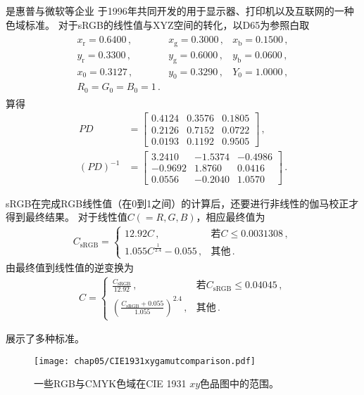 是惠普与微软等企业
于1996年共同开发的用于显示器、打印机以及互联网的一种色域标准。
对于sRGB的线性值与XYZ空间的转化，以D65为参照白取
\begin{align}
      \begin{array}{lll}
            x_\mathrm{r}=0.6400\, , & x_\mathrm{g}=0.3000\, , & x_\mathrm{b}=0.1500\, , \\
            y_\mathrm{r}=0.3300\, , & y_\mathrm{g}=0.6000\, , & y_\mathrm{b}=0.0600\, , \\
            x_0=0.3127\, ,          & y_0=0.3290\, ,          & Y_0=1.0000\, ,          \\
            R_0=G_0=B_0=1\, .       &                         &
      \end{array}
\end{align}
算得
\begin{align}
      PD        & =\left[\begin{array}{rrr}
                  0.4124 & 0.3576 & 0.1805 \\
                  0.2126 & 0.7152 & 0.0722 \\
                  0.0193 & 0.1192 & 0.9505
            \end{array}\right]\, , \\
      (PD)^{-1} & =\left[\begin{array}{rrr}
                  3.2410  & -1.5374 & -0.4986 \\
                  -0.9692 & 1.8760  & 0.0416  \\
                  0.0556  & -0.2040 & 1.0570
            \end{array}\right]\, .
\end{align}

sRGB在完成RGB线性值（在0到1之间）的计算后，还要进行非线性的伽马校正才得到最终结果。
对于线性值$C(=R,G,B)$，相应最终值为
\begin{align}
      C_{\text{sRGB}}=\left\{
      \begin{array}{ll}
            \displaystyle12.92C\, ,                       & \text{若}C\le0.0031308\, , \\
            \displaystyle1.055C^{\frac{1}{2.4}}-0.055\, , & \text{其他}\, .
      \end{array}
      \right.
\end{align}
由最终值到线性值的逆变换为
\begin{align}
      C=\left\{
      \begin{array}{ll}
            \displaystyle\frac{C_{\text{sRGB}}}{12.92}\, ,                          & \text{若}C_{\text{sRGB}}\le0.04045\, , \\
            \displaystyle\left(\frac{C_{\text{sRGB}}+0.055}{1.055}\right)^{2.4}\, , & \text{其他}\, .
      \end{array}
      \right.
\end{align}

展示了多种标准。
\begin{figure}[htbp]
      \centering\texttt{[image: chap05/CIE1931xygamutcomparison.pdf]}
      \caption{一些RGB与CMYK色域在CIE 1931 $xy$色品图中的范围。}
      \label{fig:5.ex13}
\end{figure}